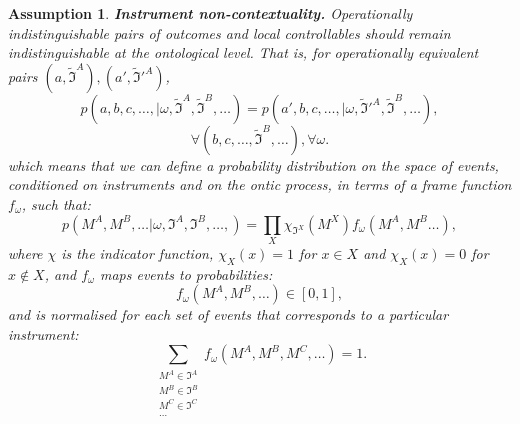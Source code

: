 \documentclass[a4paper,onecolumn,11pt,accepted=2018-05-04]{quantumarticle}
\newtheorem{assumption}{Assumption}
\begin{document}
\begin{assumption}
\textbf{Instrument non-contextuality.}
Operationally indistinguishable pairs of outcomes and local controllables should remain indistinguishable at the ontological level.
That is, for operationally equivalent pairs $(a, \tilde{\mathcal{\mathfrak{I}}}^A), (a', \tilde{\mathcal{\mathfrak{I}}}'^A)$,
\begin{equation}
p(a,b,c,\dots, | \omega, \tilde{\mathcal{\mathfrak{I}}}^A, \tilde{\mathcal{\mathfrak{I}}}^B,\dots) =  p(a',b,c,\dots, | \omega, \tilde{\mathcal{\mathfrak{I}}}'^A, \tilde{\mathcal{\mathfrak{I}}}^B,\dots),
\end{equation}
\begin{equation*}
\forall (b,c,\dots,\tilde{\mathcal{\mathfrak{I}}}^B,\dots), \forall \omega.
\end{equation*}
which means that we can define a probability distribution on the space of events, conditioned on instruments and on the ontic process, in terms of a \emph{frame function} $f_\omega$, such that:
\begin{equation}
p(M^A, M^B,\dots| \omega,\mathfrak{I}^A, \mathfrak{I}^B,\dots,) = \prod_{X}  \chi_{\mathfrak{I}^X}(M^X) f_\omega(M^A, M^B\dots),
\end{equation}
where $\chi$ is the indicator function, $\chi_X(x)=1$ for $x\in X$ and $\chi_X(x)=0$ for $x\not\in X$, and  $f_\omega$ maps events to probabilities:
\begin{equation}
 f_\omega(M^A, M^B, \dots) \in [0,1],
\end{equation}
and is normalised for each set of events that corresponds to a particular instrument:
\begin{equation}
{\sum_{\substack{M^A \in \mathfrak{I}^A\\{M^B \in \mathfrak{I}^B}\\{M^C \in \mathfrak{I}^C}\\\dots}}}f_\omega(M^A, M^B,M^C, \dots) = 1.
\end{equation}
\end{assumption}
\end{document}
